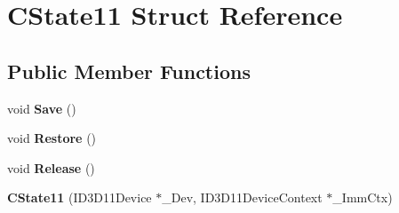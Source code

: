 \hypertarget{struct_c_state11}{\section{C\+State11 Struct Reference}
\label{struct_c_state11}
}
\subsection*{Public Member Functions}
\begin{DoxyCompactItemize}
\item 
\hypertarget{struct_c_state11_a861a3e599ef330bfe8c33cc8d3af1748}{void {\bfseries Save} ()}\label{struct_c_state11_a861a3e599ef330bfe8c33cc8d3af1748}

\item 
\hypertarget{struct_c_state11_a8730f28272ef0b23621457bc0e14c17c}{void {\bfseries Restore} ()}\label{struct_c_state11_a8730f28272ef0b23621457bc0e14c17c}

\item 
\hypertarget{struct_c_state11_a1f96c04f5593b7b9cc2d31e6f4b22c61}{void {\bfseries Release} ()}\label{struct_c_state11_a1f96c04f5593b7b9cc2d31e6f4b22c61}

\item 
\hypertarget{struct_c_state11_add2cce595534950cfede9c3df88c5dbf}{{\bfseries C\+State11} (I\+D3\+D11\+Device $\ast$\+\_\+\+Dev, I\+D3\+D11\+Device\+Context $\ast$\+\_\+\+Imm\+Ctx)}\label{struct_c_state11_add2cce595534950cfede9c3df88c5dbf}

\end{DoxyCompactItemize}
